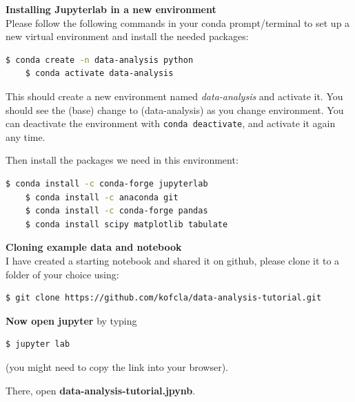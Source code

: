 \documentclass{article}
\begin{document}
\noindent
\begin{minipage}{.65\textwidth}

\textbf{Installing Jupyterlab in a new environment}\\
Please follow the following commands in your conda prompt/terminal to set up a new virtual environment and install the needed packages: 

\begin{lstlisting}[language=bash, numbers=none]   
    $ conda create -n data-analysis python 
    $ conda activate data-analysis\end{lstlisting}

This should create a new environment named \emph{data-analysis} and activate it. You should see the (base) change to (data-analysis) as you change environment. 
You can deactivate the environment with \texttt{conda deactivate}, and activate it again any time.

Then install the packages we need in this environment:

\begin{lstlisting}[language=bash, numbers=none]   
    $ conda install -c conda-forge jupyterlab
    $ conda install -c anaconda git
    $ conda install -c conda-forge pandas
    $ conda install scipy matplotlib tabulate
\end{lstlisting}

\vspace{3pt}
\textbf{Cloning example data and notebook}\\
I have created a starting notebook and shared it on github, please clone it to a folder of your choice using:

\begin{lstlisting}[language=bash, numbers=none]   
    $ git clone https://github.com/kofcla/data-analysis-tutorial.git
\end{lstlisting}

\textbf{Now open jupyter} by typing 

\begin{lstlisting}[language=bash, numbers=none]   
    $ jupyter lab 
\end{lstlisting}

(you might need to copy the link into your browser). 

There, open \textbf{data-analysis-tutorial.jpynb}. 

\end{minipage}%
\end{document}
